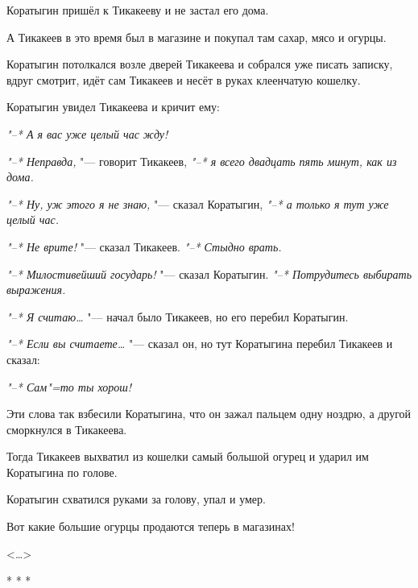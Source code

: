 Коратыгин пришёл к Тикакееву и не застал его дома.

А Тикакеев в это время был в магазине и покупал там сахар, мясо и огурцы.

Коратыгин потолкался возле дверей Тикакеева и собрался уже писать записку, вдруг смотрит, идёт сам Тикакеев и несёт в руках клеенчатую кошелку.

Коратыгин увидел Тикакеева и кричит ему:

\textit{"--* А я вас уже целый час жду!}

\textit{"--* Неправда,} "--- говорит Тикакеев, \textit{"--* я всего двадцать пять минут, как из дома.}

\textit{"--* Ну, уж этого я не знаю,} "--- сказал Коратыгин, \textit{"--* а только я тут уже целый час.}

\textit{"--* Не врите!} "--- сказал Тикакеев. \textit{"--* Стыдно врать.}

\textit{"--* Милостивейший государь!} "--- сказал Коратыгин. \textit{"--* Потрудитесь выбирать выражения.}

\textit{"--* Я считаю\dots} "--- начал было Тикакеев, но его перебил Коратыгин.

\textit{"--* Если вы считаете\dots} "--- сказал он, но тут Коратыгина перебил Тикакеев и сказал:

\textit{"--* Сам"=то ты хорош!}

Эти слова так взбесили Коратыгина, что он зажал пальцем одну ноздрю, а другой сморкнулся в Тикакеева.

Тогда Тикакеев выхватил из кошелки самый большой огурец и ударил им Коратыгина по голове.

Коратыгин схватился руками за голову, упал и умер.

Вот какие большие огурцы продаются теперь в магазинах!

\begin{flushright}
<\dots{}>
\end{flushright}

\begin{center}
* * * 
\end{center}
